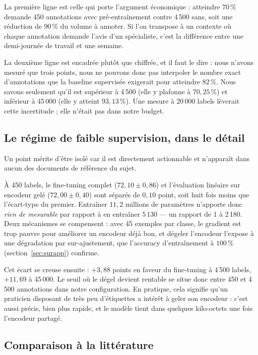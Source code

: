 \documentclass[11pt,a4paper]{article}
\begin{document}
La première ligne est celle qui porte l'argument économique : atteindre $70\,\%$ demande
450 annotations avec pré-entraînement contre 4\,500 sans, soit une réduction de $90\,\%$ du
volume à annoter. Si l'on transpose à un contexte où chaque annotation demande l'avis d'un
spécialiste, c'est la différence entre une demi-journée de travail et une semaine.

La deuxième ligne est encadrée plutôt que chiffrée, et il faut le dire : nous n'avons mesuré
que trois points, nous ne pouvons donc pas interpoler le nombre exact d'annotations que la
baseline supervisée exigerait pour atteindre $82\,\%$. Nous savons seulement qu'il est
supérieur à 4\,500 (elle y plafonne à $70{,}25\,\%$) et inférieur à 45\,000 (elle y atteint
$93{,}13\,\%$). Une mesure à 20\,000 labels lèverait cette incertitude ; elle n'était pas
dans notre budget.

\subsection{Le régime de faible supervision, dans le détail}

Un point mérite d'être isolé car il est directement actionnable et n'apparaît dans aucun
des documents de référence du sujet.

À 450 labels, le fine-tuning complet ($72{,}10 \pm 0{,}86$) et l'évaluation linéaire sur
encodeur gelé ($72{,}00 \pm 0{,}40$) sont séparés de $0{,}10$ point, soit huit fois moins
que l'écart-type du premier. Entraîner $11{,}2$ millions de paramètres n'apporte donc
\emph{rien de mesurable} par rapport à en entraîner $5\,130$ --- un rapport de 1 à 2\,180.
Deux mécanismes se compensent : avec 45 exemples par classe, le gradient est trop pauvre
pour améliorer un encodeur déjà bon, et dégeler l'encodeur l'expose à une dégradation par
sur-ajustement, que l'accuracy d'entraînement à $100\,\%$ (section~\ref{sec:surapp})
confirme.

Cet écart se creuse ensuite : $+3{,}88$ points en faveur du fine-tuning à 4\,500 labels,
$+11{,}69$ à 45\,000. Le seuil où le dégel devient rentable se situe donc entre 450 et
4\,500 annotations dans notre configuration. En pratique, cela signifie qu'un praticien
disposant de très peu d'étiquettes a intérêt à geler son encodeur : c'est aussi précis, bien
plus rapide, et le modèle tient dans quelques kilo-octets une fois l'encodeur partagé.

\subsection{Comparaison à la littérature}
\end{document}
